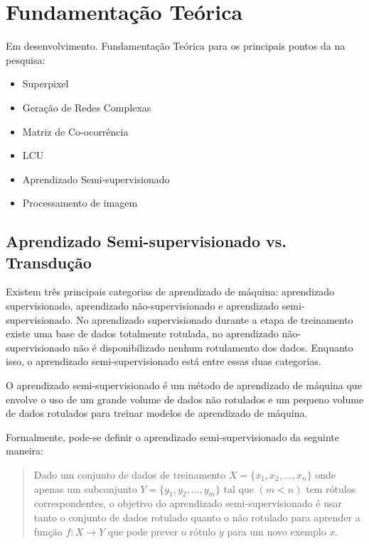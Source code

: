 \chapter{Fundamentação Teórica}\label{cap:fundamentacao-teorica}

Em desenvolvimento. Fundamentação Teórica para os principais pontos da
na pesquisa:

\begin{itemize}
\item Superpixel
\item Geração de Redes Complexas
\item Matriz de Co-ocorrência
\item \gls{LCU}
\item Aprendizado Semi-supervisionado
\item Processamento de imagem
\end{itemize}



\section{Aprendizado Semi-supervisionado vs. Transdução}\label{sec:teorica-aprendizado-semi-supervisionado}

Existem três principais categorias de aprendizado de máquina:
aprendizado supervisionado, aprendizado não-supervisionado e
aprendizado semi-supervisionado. No aprendizado supervisionado durante
a etapa de treinamento existe uma base de dados totalmente rotulada,
no aprendizado não-supervisionado não é disponibilizado nenhum
rotulamento dos dados. Enquanto isso, o aprendizado
semi-supervisionado está entre essas duas categorias.

O aprendizado semi-supervisionado é um método de aprendizado de máquina
que envolve o uso de um grande volume de dados não rotulados e um
pequeno volume de dados rotulados para treinar modelos de aprendizado
de máquina.

Formalmente, pode-se definir o aprendizado semi-supervisionado da seguinte maneira:

\begin{quote}
Dado um conjunto de dados de treinamento $ X = \{x_1, x_2, \ldots, x_n\} $
onde apenas um subconjunto  $ Y = \{y_1, y_2, \ldots , y_m\} $ tal que $ (m < n) $ tem rótulos
correspondentes, o objetivo do aprendizado semi-supervisionado é usar
tanto o conjunto de dados rotulado quanto o não rotulado para aprender
a função $ f: X \rightarrow Y $ que pode prever o rótulo $ y $ para um novo
exemplo $ x $.
\end{quote}

